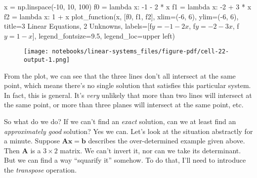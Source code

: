 \documentclass[
  letterpaper,
  DIV=11,
  numbers=noendperiod]{scrreprt}
\newenvironment{Shaded}{\begin{snugshade}}{\end{snugshade}}
\newcommand{\DecValTok}[1]{\textcolor[rgb]{0.68,0.00,0.00}{#1}}
\newcommand{\FloatTok}[1]{\textcolor[rgb]{0.68,0.00,0.00}{#1}}
\newcommand{\KeywordTok}[1]{\textcolor[rgb]{0.00,0.23,0.31}{#1}}
\newcommand{\NormalTok}[1]{\textcolor[rgb]{0.00,0.23,0.31}{#1}}
\newcommand{\OperatorTok}[1]{\textcolor[rgb]{0.37,0.37,0.37}{#1}}
\newcommand{\SpecialStringTok}[1]{\textcolor[rgb]{0.13,0.47,0.30}{#1}}
\newcommand{\StringTok}[1]{\textcolor[rgb]{0.13,0.47,0.30}{#1}}
\begin{document}
\begin{Shaded}
\begin{Highlighting}[]
\NormalTok{x }\OperatorTok{=}\NormalTok{ np.linspace(}\OperatorTok{{-}}\DecValTok{10}\NormalTok{, }\DecValTok{10}\NormalTok{, }\DecValTok{100}\NormalTok{)}
\NormalTok{f0 }\OperatorTok{=} \KeywordTok{lambda}\NormalTok{ x: }\OperatorTok{{-}}\DecValTok{1} \OperatorTok{{-}} \DecValTok{2} \OperatorTok{*}\NormalTok{ x}
\NormalTok{f1 }\OperatorTok{=} \KeywordTok{lambda}\NormalTok{ x: }\OperatorTok{{-}}\DecValTok{2} \OperatorTok{+} \DecValTok{3} \OperatorTok{*}\NormalTok{ x}
\NormalTok{f2 }\OperatorTok{=} \KeywordTok{lambda}\NormalTok{ x: }\DecValTok{1} \OperatorTok{+}\NormalTok{ x}
\NormalTok{plot\_function(x, [f0, f1, f2], xlim}\OperatorTok{=}\NormalTok{(}\OperatorTok{{-}}\DecValTok{6}\NormalTok{, }\DecValTok{6}\NormalTok{), ylim}\OperatorTok{=}\NormalTok{(}\OperatorTok{{-}}\DecValTok{6}\NormalTok{, }\DecValTok{6}\NormalTok{), }
\NormalTok{              title}\OperatorTok{=}\StringTok{\textquotesingle{}3 Linear Equations, 2 Unknowns\textquotesingle{}}\NormalTok{,}
\NormalTok{              labels}\OperatorTok{=}\NormalTok{[}\SpecialStringTok{f\textquotesingle{}$y={-}1{-}2x$\textquotesingle{}}\NormalTok{, }\SpecialStringTok{f\textquotesingle{}$y={-}2{-}3x$\textquotesingle{}}\NormalTok{, }\SpecialStringTok{f\textquotesingle{}$y=1{-}x$\textquotesingle{}}\NormalTok{], }
\NormalTok{              legend\_fontsize}\OperatorTok{=}\FloatTok{9.5}\NormalTok{, legend\_loc}\OperatorTok{=}\StringTok{\textquotesingle{}upper left\textquotesingle{}}\NormalTok{)}
\end{Highlighting}
\end{Shaded}

\begin{figure}[H]

{\centering \texttt{[image: notebooks/linear-systems\_files/figure-pdf/cell-22-output-1.png]}

}

\end{figure}

From the plot, we can see that the three lines don't all intersect at
the same point, which means there's no single solution that satisfies
this particular system. In fact, this is general. It's \emph{very}
unlikely that more than two lines will intersect at the same point, or
more than three planes will intersect at the same point, etc.

So what do we do? If we can't find an \emph{exact} solution, can we at
least find an \emph{approximately good} solution? Yes we can. Let's look
at the situation abstractly for a minute. Suppose
\(\mathbf{A}\mathbf{x} = \mathbf{b}\) describes the over-determined
example given above. Then \(\mathbf{A}\) is a \(3 \times 2\) matrix. We
can't invert it, nor can we take its determinant. But we can find a way
``squarify it'' somehow. To do that, I'll need to introduce the
\emph{transpose} operation.
\end{document}
